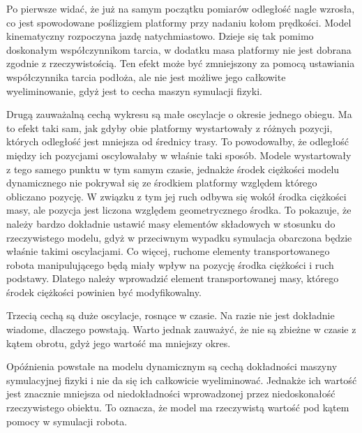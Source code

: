 	Po pierwsze widać, że już na samym początku pomiarów odległość nagle wzrosła, co jest spowodowane poślizgiem platformy przy nadaniu kołom prędkości.
	Model kinematyczny rozpoczyna jazdę natychmiastowo.
	Dzieje się tak pomimo doskonałym współczynnikom tarcia, w dodatku masa platformy nie jest dobrana zgodnie z rzeczywistością.
	Ten efekt może być zmniejszony za pomocą ustawiania współczynnika tarcia podłoża, ale nie jest możliwe jego całkowite wyeliminowanie, gdyż jest to cecha maszyn symulacji fizyki.

	Drugą zauważalną cechą wykresu są małe oscylacje o okresie jednego obiegu.
	Ma to efekt taki sam, jak gdyby obie platformy wystartowały z różnych pozycji, których odległość jest mniejsza od średnicy trasy.
	To powodowałby, że odległość między ich pozycjami oscylowałaby w właśnie taki sposób.
	Modele wystartowały z tego samego punktu w tym samym czasie, jednakże środek ciężkości modelu dynamicznego nie pokrywał się ze środkiem platformy względem którego obliczano pozycję.
	W związku z tym jej ruch odbywa się wokół środka ciężkości masy, ale pozycja jest liczona względem geometrycznego środka.
	To pokazuje, że należy bardzo dokładnie ustawić masy elementów składowych w stosunku do rzeczywistego modelu, gdyż w przeciwnym wypadku symulacja obarczona będzie właśnie takimi oscylacjami.
	Co więcej, ruchome elementy transportowanego robota manipulującego będą miały wpływ na pozycję środka ciężkości i ruch podstawy.
	Dlatego należy wprowadzić element transportowanej masy, którego środek ciężkości powinien być modyfikowalny.

	Trzecią cechą są duże oscylacje, rosnące w czasie.
	Na razie nie jest dokładnie wiadome, dlaczego powstają.
	Warto jednak zauważyć, że nie są zbieżne w czasie z kątem obrotu, gdyż jego wartość ma mniejszy okres.

	Opóźnienia powstałe na modelu dynamicznym są cechą dokładności maszyny symulacyjnej fizyki i nie da się ich całkowicie wyeliminować.
	Jednakże ich wartość jest znacznie mniejsza od niedokładności wprowadzonej przez niedoskonałość rzeczywistego obiektu.
	To oznacza, że model ma rzeczywistą wartość pod kątem pomocy w symulacji robota.

